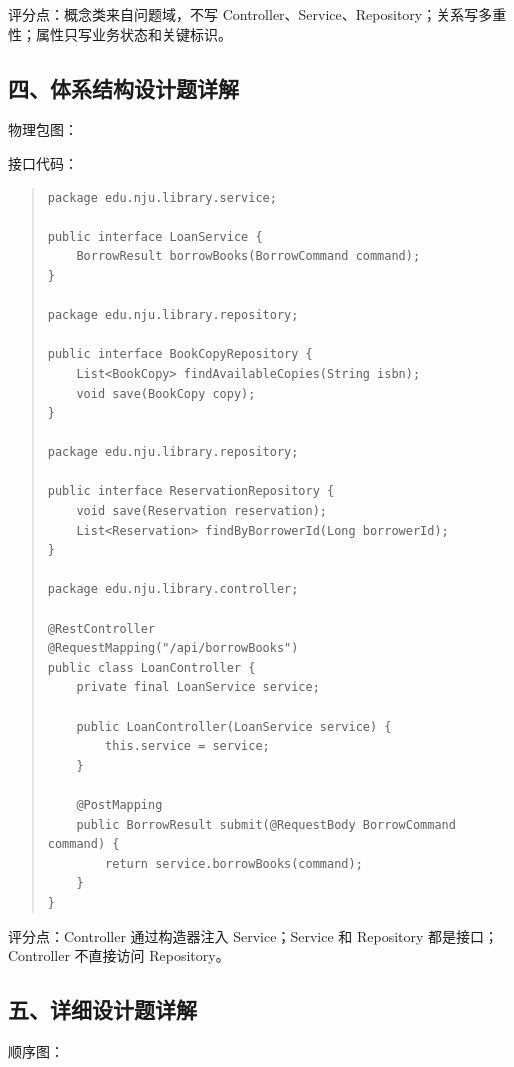 \documentclass[UTF8,zihao=-4]{ctexart}
\begin{document}
评分点：概念类来自问题域，不写 Controller、Service、Repository；关系写多重性；属性只写业务状态和关键标识。


\subsection{四、体系结构设计题详解}


物理包图：





接口代码：


\begin{quote}
\footnotesize
\begin{verbatim}
package edu.nju.library.service;

public interface LoanService {
    BorrowResult borrowBooks(BorrowCommand command);
}

package edu.nju.library.repository;

public interface BookCopyRepository {
    List<BookCopy> findAvailableCopies(String isbn);
    void save(BookCopy copy);
}

package edu.nju.library.repository;

public interface ReservationRepository {
    void save(Reservation reservation);
    List<Reservation> findByBorrowerId(Long borrowerId);
}

package edu.nju.library.controller;

@RestController
@RequestMapping("/api/borrowBooks")
public class LoanController {
    private final LoanService service;

    public LoanController(LoanService service) {
        this.service = service;
    }

    @PostMapping
    public BorrowResult submit(@RequestBody BorrowCommand command) {
        return service.borrowBooks(command);
    }
}
\end{verbatim}
\end{quote}



评分点：Controller 通过构造器注入 Service；Service 和 Repository 都是接口；Controller 不直接访问 Repository。


\subsection{五、详细设计题详解}


顺序图：
\end{document}
